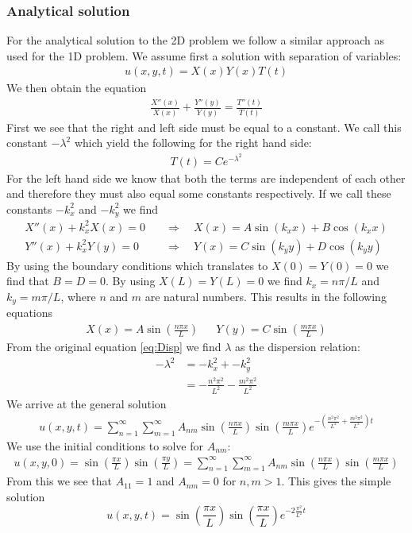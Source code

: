 \documentclass[%
 reprint,
nofootinbib,
aps,
]{revtex4-1}
\begin{document}
\subsubsection{Analytical solution}
For the analytical solution to the 2D problem we follow a similar approach as used for the 1D problem. We assume first a solution with separation of variables:
\begin{align*}
    u(x,y,t) = X(x)Y(x)T(t)
\end{align*}
We then obtain the equation
\begin{align}
    \frac{X''(x)}{X(x)} + \frac{Y''(y)}{Y(y)} = \frac{T''(t)}{T(t)}
    \label{eq:Disp}
\end{align}
First we see that the right and left side must be equal to a constant. We call this constant $-\lambda^2$ which yield the following for the right hand side:
\begin{align*}
    T(t) = Ce^{-\lambda^2}
\end{align*}
For the left hand side we know that both the terms are independent of each other and therefore they must also equal some constants respectively. If we call these constants $-k_x^2$ and $-k_y^2$  we find
\begin{align*}
   X''(x) + k_x^2X(x) = 0 & \quad \Longrightarrow \quad X(x)= A\sin{(k_xx)} + B\cos{(k_xx)} \\
    Y''(x) + k_x^2Y(y) = 0 & \quad \Longrightarrow \quad Y(x)= C\sin{(k_yy)} + D\cos{(k_yy)}
\end{align*}
By using the boundary conditions which translates to $X(0) = Y(0) = 0$ we find that $B=D=0$. By using $X(L)=Y(L) = 0$ we find $k_x = n\pi/L$ and $k_y = m\pi/L$, where $n$ and $m$ are natural numbers. This results in the following equations
\begin{align*}
    &X(x) = A\sin{(\frac{n\pi x}{L})}&  &Y(y) = C\sin{(\frac{m\pi x}{L})}&
\end{align*}
From the original equation \ref{eq:Disp} we find $\lambda$ as the dispersion relation:
\begin{align*}
    -\lambda^2 &= -k_x^2 + -k_y^2 \\
    &= -\frac{n^2\pi^2}{L^2} -\frac{m^2\pi^2}{L^2}
\end{align*}
We arrive at the general solution
\begin{align*}
    u(x,y,t) = \sum_{n=1}^\infty \sum_{m=1}^\infty A_{nm}\sin{\left(\frac{n\pi x}{L}\right)} \sin{\left(\frac{m\pi x}{L}\right)}e^{-(\frac{n^2\pi^2}{L^2} + \frac{m^2\pi^2}{L^2})t}
\end{align*}
We use the initial conditions to solve for $A_{nm}$:
\begin{align*}
    u(x,y,0) = \sin{(\frac{\pi x}{L})} \sin{(\frac{\pi y}{L})} = \sum_{n=1}^\infty \sum_{m=1}^\infty A_{nm}\sin{\left(\frac{n\pi x}{L}\right)} \sin{\left(\frac{m\pi x}{L}\right)}
\end{align*}
From this we see that $A_{11} = 1$ and $A_{nm} = 0$ for $n,m > 1$. This gives the simple solution
\begin{equation}
    u(x,y,t) = \sin{\left(\frac{\pi x}{L}\right)} \sin{\left(\frac{\pi x}{L}\right)}e^{-2\frac{\pi^2}{L^2}t}
    \label{eq:2D_ana}
\end{equation}
\end{document}
